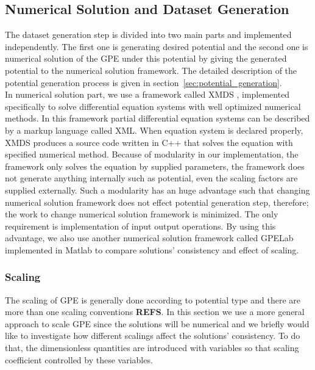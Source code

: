\documentclass[a4paper,times,hidelinks,12pt]{article}
\begin{document}
\subsection{Numerical Solution and Dataset Generation}

The dataset generation step is divided into two main parts and implemented independently. The first one is generating desired potential and the second one is numerical solution of the GPE under this potential by giving the generated potential to the numerical solution framework. The detailed description of the potential generation process is given in section~\ref{sec:potential_generation}. \\

In numerical solution part, we use a framework called XMDS \cite{dennis2013xmds2}, implemented specifically to solve differential equation systems with well optimized numerical methods. In this framework partial differential equation systems can be described by a markup language called XML.  When equation system is declared properly, XMDS produces a source code written in C++ that solves the equation with specified numerical method. Because of modularity in our implementation, the framework only solves the equation by supplied parameters, the framework does not generate anything internally such as potential, even the scaling factors are supplied externally. Such a modularity has an huge advantage such that changing numerical solution framework does not effect potential generation step, therefore; the work to change numerical solution framework is minimized. The only requirement is implementation of input output operations. By using this advantage, we also use another numerical solution framework called GPELab \cite{antoine2014gpelab} implemented in Matlab to compare solutions' consistency and effect of scaling.


\subsubsection{Scaling}

The scaling of GPE is generally done according to potential type and there are more than one scaling conventions \textbf{REFS}. In this section we use a more general approach to scale GPE since the solutions will be numerical and we briefly would like to investigate how different scalings affect the solutions' consistency. To do that, the dimensionless quantities are introduced with variables so that scaling coefficient controlled by these variables. 
\end{document}
